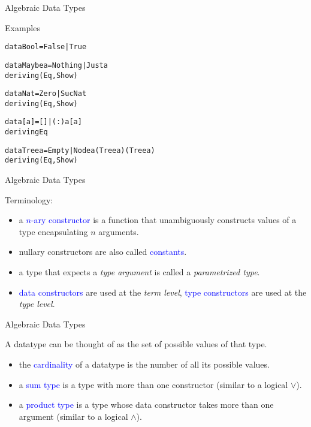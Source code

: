 \documentclass{beamer}
\begin{document}
\begin{frame}[fragile]{Algebraic Data Types}

\begin{exampleblock}{Examples}
\begin{alltt}
data Bool = False | True\pause

data Maybe a = Nothing | Just a
  deriving (Eq, Show)\pause

data Nat = Zero | Suc Nat
  deriving (Eq, Show)\pause

data [a] = [] | (:) a [a]
  deriving Eq\pause

data Tree a = Empty | Node a (Tree a) (Tree a)
  deriving (Eq, Show)
\end{alltt}
\end{exampleblock}

\end{frame}

\begin{frame}{Algebraic Data Types}

Terminology:\pause
\begin{itemize}
    \item a \textcolor{blue}{$n$-ary constructor} is a function that unambiguously constructs values of a type encapsulating $n$ arguments.\pause
    \item nullary constructors are also called \textcolor{blue}{constants}.\pause
    \item a type that expects a \textit{type argument} is called a \textit{parametrized type}.\pause
    \item \textcolor{blue}{data constructors} are used at the \textit{term level}, \textcolor{blue}{type constructors} are used at the \textit{type level}.
\end{itemize}

\end{frame}

\begin{frame}{Algebraic Data Types}

A datatype can be thought of as the set of possible values of that type.

\pause

\begin{itemize}
    \item the \textcolor{blue}{cardinality} of a datatype is the number of all its possible values.\pause
    \item a \textcolor{blue}{sum type} is a type with more than one constructor (similar to a logical $\lor$).\pause
    \item a \textcolor{blue}{product type} is a type whose data constructor takes more than one argument (similar to a logical $\land$).
\end{itemize}

\end{frame}
\end{document}
